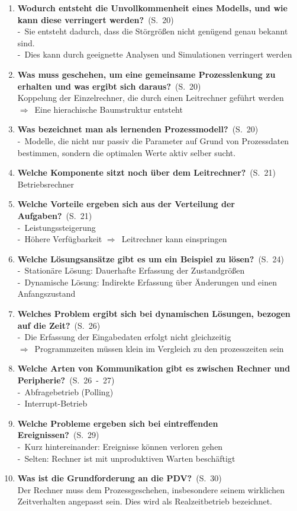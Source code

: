 \documentclass[a4paper,12pt]{article}
\newcommand{\question}[3]{\pagebreak[3]\item {\textbf{#1?}}\ (S.\ #2)#3}
\newcommand{\catchword}[1]{\\-\ #1}
\newcommand{\normaltext}[1]{\\#1}
\newcommand{\result}[1]{\\ $\Rightarrow$\ #1}
\newcommand{\resultol}[1]{ $\Rightarrow$\ #1}
\newcommand{\page}[1]{#1}
\newcommand{\pages}[2]{#1\ -\ #2}
\begin{document}
\begin{enumerate}
  \question{Wodurch entsteht die Unvollkommenheit eines Modells, und wie kann diese verringert werden}{\page{20}}
  {
    \catchword{Sie entsteht dadurch, dass die Störgrößen nicht genügend genau bekannt sind.}
    \catchword{Dies kann durch geeignette Analysen und Simulationen verringert werden}
  }

  \question{Was muss geschehen, um eine gemeinsame Prozesslenkung zu erhalten und
            was ergibt sich daraus}{\page{20}}
  {
    \normaltext{Koppelung der Einzelrechner, die durch einen Leitrechner geführt werden}
    \result{Eine hierachische Baumstruktur entsteht}
  }

  \question{Was bezeichnet man als lernenden Prozessmodell}{\page{20}}
  {
    \catchword{Modelle, die nicht nur passiv die Parameter auf Grund von Prozessdaten bestimmen, sondern die optimalen
    Werte aktiv selber sucht.}
  }

  \question{Welche Komponente sitzt noch über dem Leitrechner}{\page{21}}
  {
    \normaltext{Betriebsrechner}
  }

  \question{Welche Vorteile ergeben sich aus der Verteilung der Aufgaben}{\page{21}}
  {
    \catchword{Leistungssteigerung}
    \catchword{Höhere Verfügbarkeit \resultol{Leitrechner kann einspringen}}
  }

  \question{Welche Lösungsansätze gibt es um ein Beispiel zu lösen}{\page{24}}
  {
    \catchword{Stationäre Lösung: Dauerhafte Erfassung der Zustandgrößen}
    \catchword{Dynamische Lösung: Indirekte Erfassung über Änderungen und einen Anfangszustand}
  }

  \question{Welches Problem ergibt sich bei dynamischen Lösungen, bezogen auf die Zeit}{\page{26}}
  {
    \catchword{Die Erfassung der Eingabedaten erfolgt nicht gleichzeitig}
    \result{Programmzeiten müssen klein im Vergleich zu den prozesszeiten sein}
  }

  \question{Welche Arten von Kommunikation gibt es zwischen Rechner und Peripherie}{\pages{26}{27}}
  {
    \catchword{Abfragebetrieb (Polling)}
    \catchword{Interrupt-Betrieb}
  }

  \question{Welche Probleme ergeben sich bei eintreffenden Ereignissen}{\page{29}}
  {
    \catchword{Kurz hintereinander: Ereignisse können verloren gehen}
    \catchword{Selten: Rechner ist mit unproduktiven Warten beschäftigt}
  }

  \question{Was ist die Grundforderung an die PDV}{\page{30}}
  {
    \normaltext{Der Rechner muss dem Prozessgeschehen, insbesondere seinem wirklichen Zeitverhalten angepasst sein.
    Dies wird als Realzeitbetrieb bezeichnet.}
  }



\end{enumerate}
\end{document}
